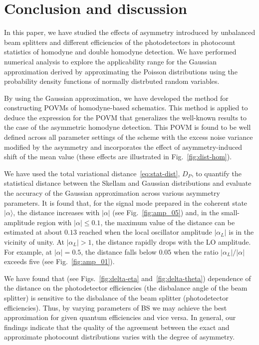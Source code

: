 \documentclass[%
reprint,
superscriptaddress,
 amsmath,amssymb,amsfonts,
 aps,
 pra,
 longbibliography
]{revtex4-2}
\newcommand{\ket}[1]{\ensuremath{|{#1}\rangle}}
\begin{document}
\section{Conclusion and discussion}
\label{sec:conclusion}

In this paper,
we have studied the effects of asymmetry
introduced by unbalanced beam splitters and different efficiencies of the photodetectors
in photocount statistics of homodyne and double homodyne detection.
We have performed numerical analysis to explore the applicability range for
the Gaussian approximation derived by approximating
the Poisson distributions using the probability density functions of
normally distrbuted random variables.

By using the Gaussian approximation,
we have developed
the method for constructing POVMs of homodyne-based
schematics.
This method is applied to deduce
the expression for the POVM
that generalizes the well-known results to the case of the asymmetric homodyne detection.
This POVM is found to be well defined across all  parameter settings of the scheme
with the excess noise variance modified by the asymmetry 
and incorporates the effect of asymmetry-induced shift of the mean value
(these effects are illustrated in Fig.~\ref{fig:dist-hom}).


We have used the total variational distance~\eqref{eq:stat-dist}, $D_P$,
to quantify the statistical distance between the Skellam and Gaussian distributions
and evaluate the accuracy of the Gaussian approximation across various asymmetry parameters.
It is found that, for the signal mode prepared in the coherent state $\ket{\alpha}$,
the distance increases with $|\alpha|$ (see Fig.~\ref{fig:amp_05}) and,
in the small-amplitude region with $|\alpha|\le 0.1$,
the maximum value of the distance can be estimated at about $0.13$
reached when the local oscillator amplitude $|\alpha_L|$ is in
the vicinity of unity. At $|\alpha_L|>1$, the distance rapidly drops with
the LO amplitude. For example, at $|\alpha|=0.5$,
the distance falls below $0.05$ when the ratio $|\alpha_L|/|\alpha|$ exceeds five
(see Fig.~\ref{fig:amp_01}).

We have found that
(see Figs.~\ref{fig:delta-eta} and~\ref{fig:delta-theta})
dependence of the distance on
the photodetector efficiencies
(the disbalance angle of the beam splitter)
is sensitive to the disbalance of the beam splitter
(photodetector efficiencies).
Thus,
by varying parameters of BS we may achieve the best approximation for given
quantum efficiencies and vice versa.
In general,
our findings indicate that the quality of the agreement between
the exact and approximate photocount distributions varies with
the degree of asymmetry.
\end{document}
